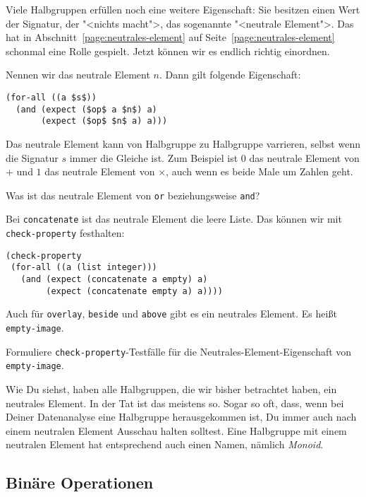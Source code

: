 Viele Halbgruppen erfüllen noch eine weitere Eigenschaft: Sie besitzen
einen Wert der Signatur, der "<nichts macht">, das sogenannte
"<neutrale Element">. Das hat in
Abschnitt~\ref{page:neutrales-element} auf
Seite~\ref{page:neutrales-element} schonmal eine Rolle gespielt.
Jetzt können wir es endlich richtig einordnen.

Nennen wir das neutrale Element $n$.  Dann gilt folgende Eigenschaft:
%
\begin{lstlisting}
(for-all ((a $s$))
  (and (expect ($op$ a $n$) a)
       (expect ($op$ $n$ a) a)))
\end{lstlisting}
%
Das neutrale Element kann von Halbgruppe zu Halbgruppe varrieren,
selbst wenn die Signatur $s$ immer die Gleiche ist.  Zum Beispiel ist
$0$ das neutrale Element von $+$ und $1$ das neutrale Element von
$\times$, auch wenn es beide Male um Zahlen geht.

\begin{aufgabeinline}
  Was ist das neutrale Element von \lstinline{or} beziehungsweise
  \lstinline{and}?
\end{aufgabeinline}
%
Bei \lstinline{concatenate} ist das neutrale Element die leere Liste.
Das können wir mit \lstinline{check-property} festhalten:
%
\begin{lstlisting}
(check-property
 (for-all ((a (list integer)))
   (and (expect (concatenate a empty) a)
        (expect (concatenate empty a) a))))
\end{lstlisting}
%
Auch für \lstinline{overlay}, \lstinline{beside} und \lstinline{above}
gibt es ein neutrales Element.  Es heißt
\lstinline{empty-image}.
%
\begin{aufgabeinline}
  Formuliere \lstinline{check-property}-Testfälle für die
  Neutrales-Element-Eigenschaft von \lstinline{empty-image}.
\end{aufgabeinline}
%
Wie Du siehst, haben alle Halbgruppen, die wir bisher betrachtet
haben, ein neutrales Element.  In der Tat ist das meistens so.  Sogar
so oft, dass, wenn bei Deiner Datenanalyse eine Halbgruppe
herausgekommen ist, Du immer auch nach einem neutralen Element
Ausschau halten solltest.  Eine Halbgruppe mit einem neutralen Element
hat entsprechend auch einen Namen, nämlich \textit{Monoid}.

\subsection{Binäre Operationen}
\label{sec:eigenschaften-binaere-operationen}

